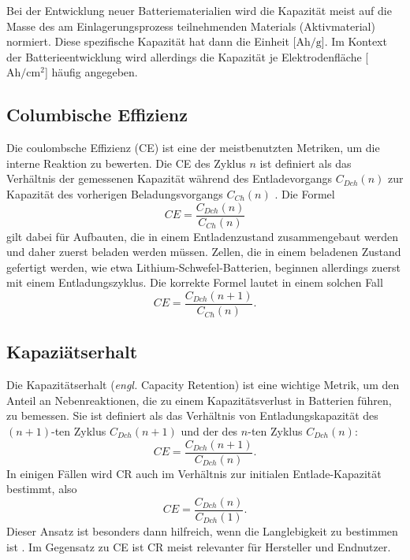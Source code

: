 
Bei der Entwicklung neuer Batteriematerialien wird die Kapazität meist auf die Masse des am Einlagerungsprozess teilnehmenden Materials (Aktivmaterial) normiert. Diese spezifische Kapazität hat dann die Einheit [$\si{\A \hour \per \g}$]. Im Kontext der Batterieentwicklung wird allerdings die Kapazität je Elektrodenfläche [$\si{\A \hour \per \cm\squared}$] häufig angegeben.


\subsection{Columbische Effizienz}
Die coulombsche Effizienz (CE) ist eine der meistbenutzten Metriken, um die interne Reaktion zu bewerten. Die CE des Zyklus \( n \) ist definiert als das Verhältnis der gemessenen Kapazität während des Entladevorgangs \( C_{Dch}(n) \) zur Kapazität des vorherigen Beladungsvorgangs \( C_{Ch}(n) \) \cite{Tornheim2020}.
Die Formel
\begin{equation}
CE = \frac{C_{Dch}(n)}{C_{Ch}(n)}
\end{equation}
gilt dabei für Aufbauten, die in einem Entladenzustand zusammengebaut werden und daher zuerst beladen werden müssen. Zellen, die in einem beladenen Zustand gefertigt werden, wie etwa Lithium-Schwefel-Batterien, beginnen allerdings zuerst mit einem Entladungszyklus. Die korrekte Formel lautet in einem solchen Fall
\begin{equation}
    CE = \frac{C_{Dch}(n+1)}{C_{Ch}(n)}.
\end{equation}

\subsection{Kapaziätserhalt}
Die Kapazitätserhalt (\textit{engl.} Capacity Retention) ist eine wichtige Metrik, um den Anteil an Nebenreaktionen, die zu einem Kapazitätsverlust in Batterien führen, zu bemessen. Sie ist definiert als das Verhältnis von Entladungskapazität des $(n+1)$-ten Zyklus $C_{Dch}(n+1)$ und der des $n$-ten Zyklus $C_{Dch}(n)$:
\begin{equation}
    CE = \frac{C_{Dch}(n+1)}{C_{Dch}(n)}.
\end{equation}
In einigen Fällen wird CR auch im Verhältnis zur initialen Entlade-Kapazität bestimmt, also
\begin{equation}
    CE = \frac{C_{Dch}(n)}{C_{Dch}(1)}.
\end{equation}
Dieser Ansatz ist besonders dann hilfreich, wenn die Langlebigkeit zu bestimmen ist \cite{Tornheim2020}.
Im Gegensatz zu CE ist CR meist relevanter für Hersteller und Endnutzer.

